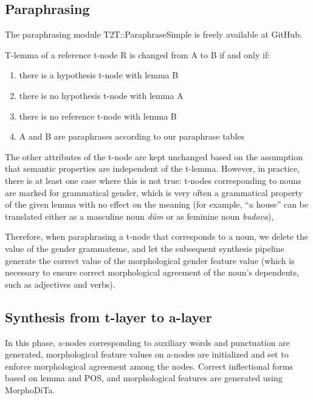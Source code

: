 \subsection{Paraphrasing}
The paraphrasing module T2T::ParaphraseSimple 
is freely available at 
GitHub. 

T-lemma of a reference t-node R is changed from A to B if and only if:
\begin{enumerate}
\item there is a hypothesis t-node with lemma B
\item there is no hypothesis t-node with lemma A 
\item there is no reference t-node with lemma B
\item A and B are paraphrases according to our paraphrase tables
\end{enumerate}

The other attributes of the t-node are kept unchanged based on the assumption that
semantic properties are independent of the t-lemma. However, in practice, there 
is at least one case where this is not true: t-nodes corresponding to nouns are 
marked for grammatical %
gender, which is very often a grammatical property of 
the given lemma with no effect on the meaning (for example, ``a house'' can be 
translated either as a masculine noun \textit{dům} or as feminine noun 
\textit{budova}),

Therefore, when paraphrasing a t-node that corresponds to a noun, we delete 
the value of the gender grammateme, and let the subsequent synthesis pipeline 
generate the correct value of the morphological gender feature value (which is 
necessary to ensure correct morphological agreement of the noun's dependents, 
such as adjectives and verbs).

\subsection{Synthesis from t-layer to a-layer}
In this phase, a-nodes corresponding to auxiliary words and punctuation are 
generated, morphological feature values on a-nodes are initialized and set to 
enforce morphological agreement among the nodes. Correct inflectional forms based 
on lemma and POS, and morphological features are generated using MorphoDiTa.


